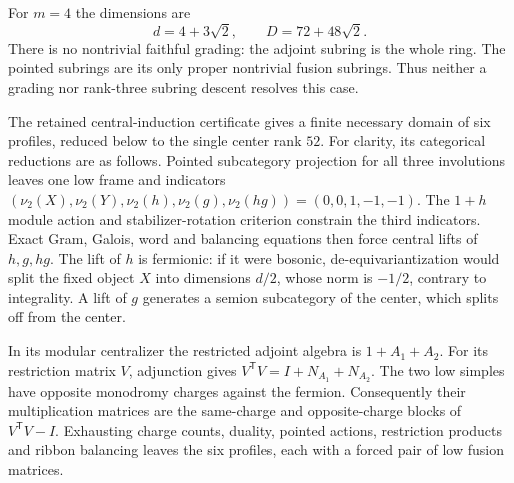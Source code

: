 For $m=4$ the dimensions are
\[
 d=4+3\sqrt2,\qquad D=72+48\sqrt2.
\]
There is no nontrivial faithful grading: the adjoint subring is the
whole ring. The pointed subrings are its only proper nontrivial fusion
subrings. Thus neither a grading nor rank-three subring descent resolves
this case.

The retained central-induction certificate gives a finite necessary
domain of six profiles, reduced below to the single center rank $52$.
For clarity, its categorical reductions are as follows. Pointed
subcategory projection for all three involutions leaves one low frame
and indicators $(\nu_2(X),\nu_2(Y),\nu_2(h),\nu_2(g),\nu_2(hg))
=(0,0,1,-1,-1)$. The $1+h$ module action and stabilizer-rotation
criterion constrain the third indicators. Exact Gram, Galois, word
and balancing equations then force central lifts of $h,g,hg$.
The lift of $h$ is fermionic: if it were bosonic, de-equivariantization
would split the fixed object $X$ into dimensions $d/2$, whose norm
is $-1/2$, contrary to integrality. A lift of $g$ generates a semion
subcategory of the center, which splits off from the center.

In its modular centralizer the restricted adjoint algebra is
$1+A_1+A_2$. For its restriction matrix $V$, adjunction gives
$V^{\mathsf T}V=I+N_{A_1}+N_{A_2}$. The two low simples have opposite
monodromy charges against the fermion. Consequently their multiplication
matrices are the same-charge and opposite-charge blocks of
$V^{\mathsf T}V-I$. Exhausting charge counts, duality, pointed actions,
restriction products and ribbon balancing leaves the six profiles,
each with a forced pair of low fusion matrices.

